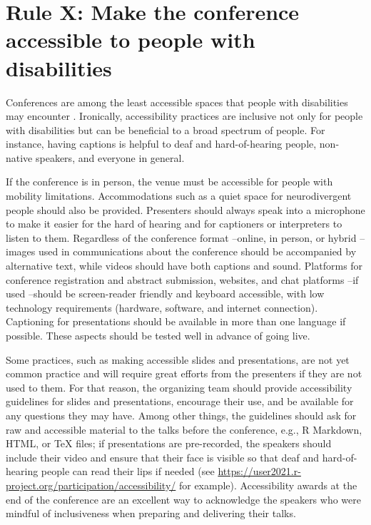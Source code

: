\documentclass[10pt,letterpaper]{article}
\begin{document}
\section{Rule X: Make the conference accessible to people with disabilities}
\label{rule_accessibility}

Conferences are among the least accessible spaces that people with disabilities may encounter \cite{priceAccessImaginedConstruction2009}.
Ironically, accessibility practices are inclusive not only for people with disabilities but can be beneficial to a broad spectrum of people. For instance, having captions is helpful to deaf and hard-of-hearing people, non-native speakers, and everyone in general. 

If the conference is in person, the venue must be accessible for people with mobility limitations. 
Accommodations such as a quiet space for neurodivergent people should also be provided.
Presenters should always speak into a microphone to make it easier for the hard of hearing and for captioners or interpreters to listen to them. 
Regardless of the conference format --online, in person, or hybrid --images used in communications about the conference should be accompanied by alternative text, while videos should have both captions and sound. 
Platforms for conference registration and abstract submission, websites, and chat platforms --if used --should be screen-reader friendly and keyboard accessible, with low technology requirements (hardware, software, and internet connection). 
Captioning for presentations should be available in more than one language if possible.
These aspects should be tested well in advance of going live.  

Some practices, such as making accessible slides and presentations, are not yet common practice and will require great efforts from the presenters if they are not used to them. 
For that reason, the organizing team should provide accessibility guidelines for slides and presentations, encourage their use, and be available for any questions they may have.  
Among other things, the guidelines should ask for raw and accessible material to the talks before the conference, e.g., R Markdown, HTML, or \TeX{} files; if presentations are pre-recorded, the speakers should include their video and ensure that their face is visible so that deaf and hard-of-hearing people can read their lips if needed (see \url{https://user2021.r-project.org/participation/accessibility/} for example). 
Accessibility awards at the end of the conference are an excellent way to acknowledge the speakers who were mindful of inclusiveness when preparing and delivering their talks. 
\end{document}
